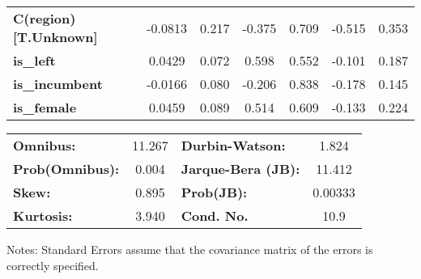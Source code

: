 \begin{center}
\begin{tabular}{lcccccc}
\textbf{C(region)[T.Unknown]}  &      -0.0813  &        0.217     &    -0.375  &         0.709        &       -0.515    &        0.353     \\
\textbf{is\_left}              &       0.0429  &        0.072     &     0.598  &         0.552        &       -0.101    &        0.187     \\
\textbf{is\_incumbent}         &      -0.0166  &        0.080     &    -0.206  &         0.838        &       -0.178    &        0.145     \\
\textbf{is\_female}            &       0.0459  &        0.089     &     0.514  &         0.609        &       -0.133    &        0.224     \\
\bottomrule
\end{tabular}
\begin{tabular}{lclc}
\textbf{Omnibus:}       & 11.267 & \textbf{  Durbin-Watson:     } &    1.824  \\
\textbf{Prob(Omnibus):} &  0.004 & \textbf{  Jarque-Bera (JB):  } &   11.412  \\
\textbf{Skew:}          &  0.895 & \textbf{  Prob(JB):          } &  0.00333  \\
\textbf{Kurtosis:}      &  3.940 & \textbf{  Cond. No.          } &     10.9  \\
\bottomrule
\end{tabular}
\end{center}

Notes: \newline
 [1] Standard Errors assume that the covariance matrix of the errors is correctly specified.